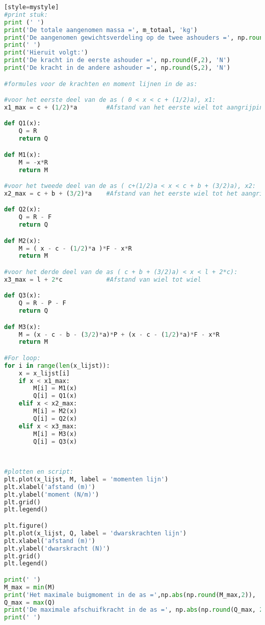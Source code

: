\begin{lstlisting}[language=Python][style=mystyle]
#print stuk:
print (' ')
print('De totale aangenomen massa =', m_totaal, 'kg')
print('De aangenomen gewichtsverdeling op de twee ashouders =', np.round(verdeling_gewicht, 3), 'tot', np.round(1 - verdeling_gewicht, 3), 'respectievelijk')
print(' ')
print('Hieruit volgt:')
print('De kracht in de eerste ashouder =', np.round(F,2), 'N')
print('De kracht in de andere ashouder =', np.round(S,2), 'N')

#formules voor de krachten en moment lijnen in de as:

#voor het eerste deel van de as ( 0 < x < c + (1/2)a), x1:
x1_max = c + (1/2)*a        #Afstand van het eerste wiel tot aangrijpingspunt van de kracht bij de eerste ashouder

def Q1(x):
    Q = R
    return Q

def M1(x):
    M = -x*R
    return M

#voor het tweede deel van de as ( c+(1/2)a < x < c + b + (3/2)a), x2:
x2_max = c + b + (3/2)*a    #Afstand van het eerste wiel tot het aangrijpingspunt van de kracht bij de tweede ashouder

def Q2(x):
    Q = R - F
    return Q

def M2(x):
    M = ( x - c - (1/2)*a )*F - x*R
    return M

#voor het derde deel van de as ( c + b + (3/2)a) < x < l + 2*c):
x3_max = l + 2*c            #Afstand van wiel tot wiel

def Q3(x):
    Q = R - P - F
    return Q

def M3(x):
    M = (x - c - b - (3/2)*a)*P + (x - c - (1/2)*a)*F - x*R
    return M

#For loop:
for i in range(len(x_lijst)):
    x = x_lijst[i]
    if x < x1_max:
        M[i] = M1(x)
        Q[i] = Q1(x)
    elif x < x2_max:
        M[i] = M2(x)
        Q[i] = Q2(x)
    elif x < x3_max:
        M[i] = M3(x)
        Q[i] = Q3(x)
      
    
    
#plotten en script:
plt.plot(x_lijst, M, label = 'momenten lijn')
plt.xlabel('afstand (m)')
plt.ylabel('moment (N/m)')
plt.grid()
plt.legend()

plt.figure()
plt.plot(x_lijst, Q, label = 'dwarskrachten lijn')
plt.xlabel('afstand (m)')
plt.ylabel('dwarskracht (N)')
plt.grid()
plt.legend()

print(' ')
M_max = min(M)    
print('Het maximale buigmoment in de as =',np.abs(np.round(M_max,2)), 'N/m')  
Q_max = max(Q)
print('De maximale afschuifkracht in de as =', np.abs(np.round(Q_max, 2)), 'N')
print(' ')


\end{lstlisting}
